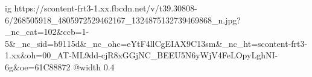  
 
 
 
 

\ifcmt
  ig https://scontent-frt3-1.xx.fbcdn.net/v/t39.30808-6/268505918_4805972529462167_1324875132739469868_n.jpg?_nc_cat=102&ccb=1-5&_nc_sid=b9115d&_nc_ohc=eYtF4llCgEIAX9C13sm&_nc_ht=scontent-frt3-1.xx&oh=00_AT-ML9dd-cjR8xGGjNC_BEEU5N6yWjV4FeLOpyLghNI-6g&oe=61C88872
  @width 0.4
\fi
